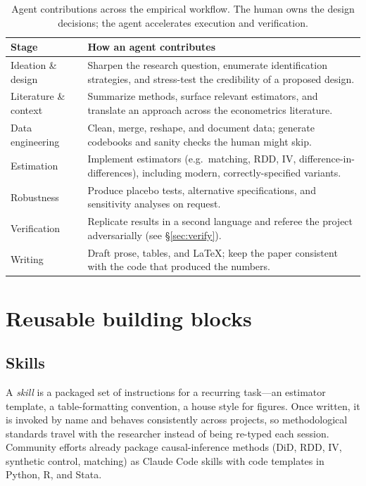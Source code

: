 \documentclass[11pt]{article}
\begin{document}
\begin{table}[h]
\centering
\begin{tabular}{@{}p{3.4cm}p{10.2cm}@{}}
\toprule
\textbf{Stage} & \textbf{How an agent contributes} \\
\midrule
Ideation \& design & Sharpen the research question, enumerate identification
  strategies, and stress-test the credibility of a proposed design. \\
Literature \& context & Summarize methods, surface relevant estimators, and
  translate an approach across the econometrics literature. \\
Data engineering & Clean, merge, reshape, and document data; generate
  codebooks and sanity checks the human might skip. \\
Estimation & Implement estimators (e.g.\ matching, RDD, IV, difference-in-differences),
  including modern, correctly-specified variants. \\
Robustness & Produce placebo tests, alternative specifications, and
  sensitivity analyses on request. \\
Verification & Replicate results in a second language and referee the project
  adversarially (see \S\ref{sec:verify}). \\
Writing & Draft prose, tables, and \LaTeX; keep the paper consistent with the
  code that produced the numbers. \\
\bottomrule
\end{tabular}
\caption{Agent contributions across the empirical workflow. The human owns the
design decisions; the agent accelerates execution and verification.}
\end{table}

\section{Reusable building blocks}

\subsection{Skills}
A \emph{skill} is a packaged set of instructions for a recurring task---an
estimator template, a table-formatting convention, a house style for figures.
Once written, it is invoked by name and behaves consistently across projects,
so methodological standards travel with the researcher instead of being
re-typed each session. Community efforts already package causal-inference
methods (DiD, RDD, IV, synthetic control, matching) as Claude Code skills with
code templates in Python, R, and Stata.
\end{document}
